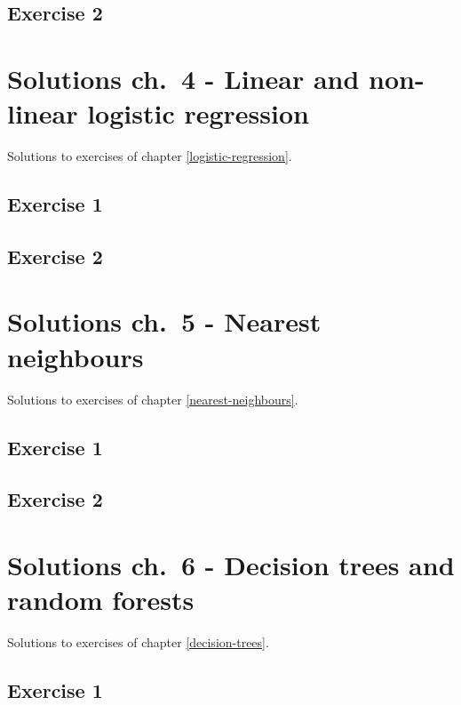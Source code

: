 \documentclass[]{book}
\theoremstyle{definition}
\theoremstyle{definition}
\theoremstyle{definition}
\theoremstyle{remark}
\begin{document}
\section{Exercise 2}\label{exercise-2}

\chapter{Solutions ch.~4 - Linear and non-linear logistic
regression}\label{solutions-logistic-regression}

Solutions to exercises of chapter \ref{logistic-regression}.

\section{Exercise 1}\label{exercise-1-1}

\section{Exercise 2}\label{exercise-2-1}

\chapter{Solutions ch.~5 - Nearest
neighbours}\label{solutions-nearest-neighbours}

Solutions to exercises of chapter \ref{nearest-neighbours}.

\section{Exercise 1}\label{exercise-1-2}

\section{Exercise 2}\label{exercise-2-2}

\chapter{Solutions ch.~6 - Decision trees and random
forests}\label{solutions-decision-trees}

Solutions to exercises of chapter \ref{decision-trees}.

\section{Exercise 1}\label{exercise-1-3}
\end{document}
